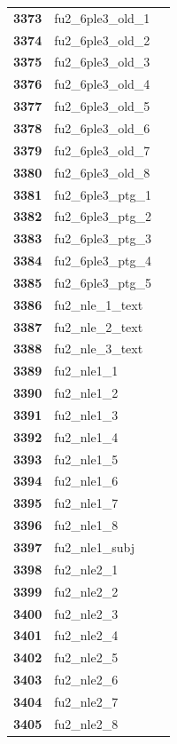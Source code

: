 \documentclass[
  letterpaper,
  DIV=11,
  numbers=noendperiod]{scrartcl}
\begin{document}
\begin{longtable}[t]{>{}cll}
\textbf{3373} & fu2\_6ple3\_old\_1 & \\
\textbf{3374} & fu2\_6ple3\_old\_2 & \\
\textbf{3375} & fu2\_6ple3\_old\_3 & \\
\addlinespace
\textbf{3376} & fu2\_6ple3\_old\_4 & \\
\textbf{3377} & fu2\_6ple3\_old\_5 & \\
\textbf{3378} & fu2\_6ple3\_old\_6 & \\
\textbf{3379} & fu2\_6ple3\_old\_7 & \\
\textbf{3380} & fu2\_6ple3\_old\_8 & \\
\addlinespace
\textbf{3381} & fu2\_6ple3\_ptg\_1 & \\
\textbf{3382} & fu2\_6ple3\_ptg\_2 & \\
\textbf{3383} & fu2\_6ple3\_ptg\_3 & \\
\textbf{3384} & fu2\_6ple3\_ptg\_4 & \\
\textbf{3385} & fu2\_6ple3\_ptg\_5 & \\
\addlinespace
\textbf{3386} & fu2\_nle\_1\_text & \\
\textbf{3387} & fu2\_nle\_2\_text & \\
\textbf{3388} & fu2\_nle\_3\_text & \\
\textbf{3389} & fu2\_nle1\_1 & \\
\textbf{3390} & fu2\_nle1\_2 & \\
\addlinespace
\textbf{3391} & fu2\_nle1\_3 & \\
\textbf{3392} & fu2\_nle1\_4 & \\
\textbf{3393} & fu2\_nle1\_5 & \\
\textbf{3394} & fu2\_nle1\_6 & \\
\textbf{3395} & fu2\_nle1\_7 & \\
\addlinespace
\textbf{3396} & fu2\_nle1\_8 & \\
\textbf{3397} & fu2\_nle1\_subj & \\
\textbf{3398} & fu2\_nle2\_1 & \\
\textbf{3399} & fu2\_nle2\_2 & \\
\textbf{3400} & fu2\_nle2\_3 & \\
\addlinespace
\textbf{3401} & fu2\_nle2\_4 & \\
\textbf{3402} & fu2\_nle2\_5 & \\
\textbf{3403} & fu2\_nle2\_6 & \\
\textbf{3404} & fu2\_nle2\_7 & \\
\textbf{3405} & fu2\_nle2\_8 & \\

\end{longtable}
\end{document}
